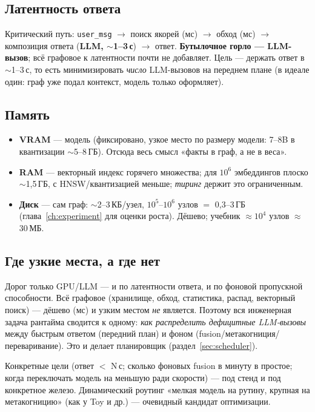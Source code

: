 \subsection{Латентность ответа}

Критический путь: \texttt{user\_msg} $\to$ поиск якорей (мс) $\to$ обход (мс) $\to$
композиция ответа (\textbf{LLM, $\sim$1--3\,с}) $\to$ ответ. \textbf{Бутылочное горло —
LLM-вызов}; всё графовое к латентности почти не добавляет. Цель — держать ответ в
$\sim$1--3\,с, то есть минимизировать \emph{число} LLM-вызовов на переднем плане (в
идеале один: граф уже подал контекст, модель только оформляет).

\subsection{Память}

\begin{itemize}\itemsep1pt
\item \textbf{VRAM} — модель (фиксировано, узкое место по размеру модели: 7--8B в
квантизации $\sim$5--8\,ГБ). Отсюда весь смысл «факты в граф, а не в веса».
\item \textbf{RAM} — векторный индекс горячего множества; для $10^6$ эмбеддингов
плоско $\sim$1,5\,ГБ, с HNSW/квантизацией меньше; \emph{тиринг} держит это ограниченным.
\item \textbf{Диск} — сам граф: $\sim$2--3\,КБ/узел, $10^5$--$10^6$ узлов $=$
0,3--3\,ГБ (глава~\ref{ch:experiment} для оценки роста). Дёшево; учебник $\approx 10^4$
узлов $\approx$ 30\,МБ.
\end{itemize}

\subsection{Где узкие места, а где нет}

\begin{principle}
Дорог только GPU/LLM — и по латентности ответа, и по фоновой пропускной способности.
Всё графовое (хранилище, обход, статистика, распад, векторный поиск) — дёшево (мс) и
узким местом \emph{не} является. Поэтому вся инженерная задача рантайма сводится к
одному: \emph{как распределить дефицитные LLM-вызовы} между быстрым ответом (передний
план) и фоном (fusion/метакогниция/переваривание). Это и делает планировщик
(раздел~\ref{sec:scheduler}).
\end{principle}

\begin{openq}
Конкретные цели (ответ $<$ N\,с; сколько фоновых fusion в минуту в простое; когда
переключать модель на меньшую ради скорости) — под стенд и под конкретное железо.
Динамический роутинг «мелкая модель на рутину, крупная на метакогницию» (как у Toy и
др.) — очевидный кандидат оптимизации.
\end{openq}

